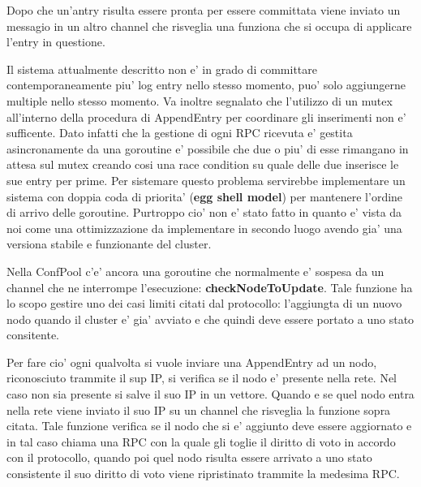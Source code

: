 \begin{itemize}
        Dopo che un'antry risulta essere pronta per essere committata viene inviato un messagio
        in un altro channel che risveglia una funziona che si occupa di applicare l'entry in 
        questione.

        Il sistema attualmente descritto non e' in grado di committare contemporaneamente 
        piu' log entry nello stesso momento, puo' solo aggiungerne multiple nello stesso momento.
        Va inoltre segnalato che l'utilizzo di un mutex all'interno della procedura 
        di AppendEntry per coordinare gli inserimenti non e' sufficente. Dato infatti che 
        la gestione di ogni RPC ricevuta e' gestita asincronamente da una goroutine
        e' possibile che due o piu' di esse rimangano in attesa sul mutex creando cosi una race
        condition su quale delle due inserisce le sue entry per prime. Per sistemare questo 
        problema servirebbe implementare un sistema con doppia coda di priorita'
        (\textbf{egg shell model}) per mantenere l'ordine di arrivo delle goroutine.
        Purtroppo cio' non e' stato fatto in quanto e' vista da noi come una ottimizzazione da
        implementare in secondo luogo avendo gia' una versiona stabile e funzionante del cluster.

        Nella ConfPool c'e' ancora una goroutine che normalmente e' sospesa da un channel che ne
        interrompe l'esecuzione: \textbf{checkNodeToUpdate}.
        Tale funzione ha lo scopo gestire uno dei casi limiti citati dal protocollo: l'aggiungta
        di un nuovo nodo quando il cluster e' gia' avviato e che quindi deve essere portato a 
        uno stato consitente.

        Per fare cio' ogni qualvolta si vuole inviare una AppendEntry ad un nodo, riconosciuto
        trammite il sup IP, si verifica se il nodo e' presente nella rete. Nel caso non sia presente
        si salve il suo IP in un vettore.
        Quando e se quel nodo entra nella rete viene inviato il suo IP su un channel che risveglia
        la funzione sopra citata. Tale funzione verifica se il nodo che si e' aggiunto deve essere
        aggiornato e in tal caso chiama una RPC con la quale gli toglie il diritto di voto in accordo
        con il protocollo, quando poi quel nodo risulta essere arrivato a uno stato consistente
        il suo diritto di voto viene ripristinato trammite la medesima RPC.


\end{itemize}
